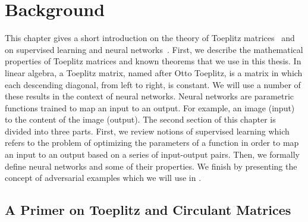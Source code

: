 \chapter{Background}
\label{chapter:ch2-background}
\localtoc


\vspace{\fill}

This chapter gives a short introduction on the theory of Toeplitz matrices~\cite{gray2006toeplitz} and on supervised learning and neural networks~\cite{shalev2014understanding}.
First, we describe the mathematical properties of Toeplitz matrices and known theorems that we use in this thesis. 
In linear algebra, a Toeplitz matrix, named after Otto Toeplitz, is a matrix in which each descending diagonal, from left to right, is constant.
We will use a number of these results in the context of neural networks.
Neural networks are parametric functions trained to map an input to an output.
For example, an image (input) to the content of the image (output).
The second section of this chapter is divided into three parts.
First, we review notions of supervised learning which refers to the problem of optimizing the parameters of a function in order to map an input to an output based on a series of input-output pairs.
Then, we formally define neural networks and some of their properties.
We finish by presenting the concept of adversarial examples which we will use in .

\vspace{\fill}



\section{A Primer on Toeplitz and Circulant Matrices}
\label{section:ch2-a_primer_on_toeplitz_and_circulant_matrices}



